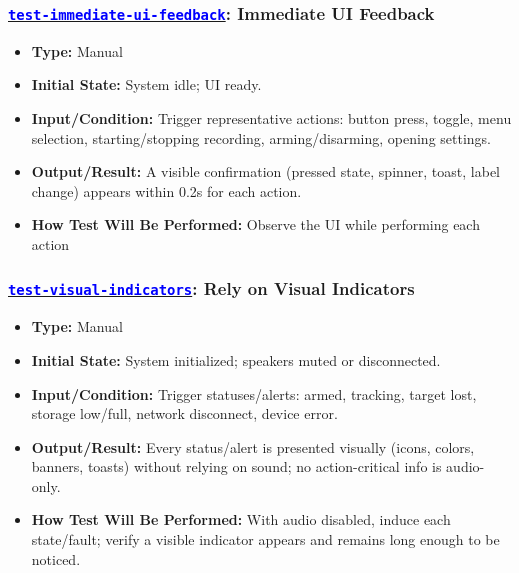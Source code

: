 \documentclass[12pt, titlepage]{article}
\newcommand{\tid}[1]{\hyperlink{tid:#1}{\textcolor{blue}{\texttt{#1}}}}
\begin{document}
\subsubsection*{\tid{test-immediate-ui-feedback}: Immediate UI Feedback}
\begin{itemize}
  \item \textbf{Type:} Manual
  \item \textbf{Initial State:} System idle; UI ready.
  \item \textbf{Input/Condition:} Trigger representative actions: button press, toggle, menu selection, starting/stopping recording, arming/disarming, opening settings.
  \item \textbf{Output/Result:} A visible confirmation (pressed state, spinner, toast, label change) appears within 0.2s for each action.
  \item \textbf{How Test Will Be Performed:} Observe the UI while performing each action
\end{itemize}

\subsubsection*{\tid{test-visual-indicators}: Rely on Visual Indicators}
\begin{itemize}
  \item \textbf{Type:} Manual
  \item \textbf{Initial State:} System initialized; speakers muted or disconnected.
  \item \textbf{Input/Condition:} Trigger statuses/alerts: armed, tracking, target lost, storage low/full, network disconnect, device error.
  \item \textbf{Output/Result:} Every status/alert is presented visually (icons, colors, banners, toasts) without relying on sound; no action-critical info is audio-only.
  \item \textbf{How Test Will Be Performed:} With audio disabled, induce each state/fault; verify a visible indicator appears and remains long enough to be noticed.
\end{itemize}
\end{document}
